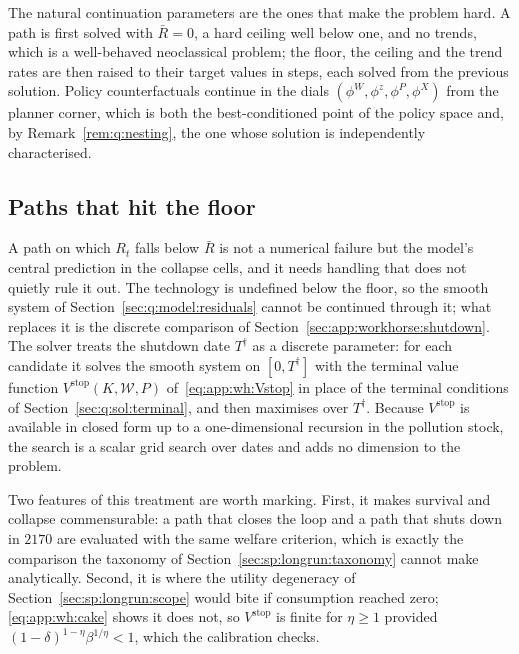  The natural continuation parameters are the ones that make the problem hard. A path is first solved with $\bar R=0$, a hard ceiling well below one, and no trends, which is a well-behaved neoclassical problem; the floor, the ceiling and the trend rates are then raised to their target values in steps, each solved from the previous solution. Policy counterfactuals continue in the dials $\left(\phi^W,\phi^z,\phi^P,\phi^X\right)$ from the planner corner, which is both the best-conditioned point of the policy space and, by Remark~\ref{rem:q:nesting}, the one whose solution is independently characterised.

\subsection{Paths that hit the floor}\label{sec:q:sol:collapse}

A path on which $R_t$ falls below $\bar R$ is not a numerical failure but the model's central prediction in the collapse cells, and it needs handling that does not quietly rule it out. The technology is undefined below the floor, so the smooth system of Section~\ref{sec:q:model:residuals} cannot be continued through it; what replaces it is the discrete comparison of Section~\ref{sec:app:workhorse:shutdown}. The solver treats the shutdown date $T^{\dagger}$ as a discrete parameter: for each candidate it solves the smooth system on $\left[0,T^{\dagger}\right]$ with the terminal value function $V^{\mathrm{stop}}\left(K,\mathcal W,P\right)$ of~\eqref{eq:app:wh:Vstop} in place of the terminal conditions of Section~\ref{sec:q:sol:terminal}, and then maximises over $T^{\dagger}$. Because $V^{\mathrm{stop}}$ is available in closed form up to a one-dimensional recursion in the pollution stock, the search is a scalar grid search over dates and adds no dimension to the problem.

Two features of this treatment are worth marking. First, it makes survival and collapse commensurable: a path that closes the loop and a path that shuts down in $2170$ are evaluated with the same welfare criterion, which is exactly the comparison the taxonomy of Section~\ref{sec:sp:longrun:taxonomy} cannot make analytically. Second, it is where the utility degeneracy of Section~\ref{sec:sp:longrun:scope} would bite if consumption reached zero; \eqref{eq:app:wh:cake} shows it does not, so $V^{\mathrm{stop}}$ is finite for $\eta\ge1$ provided $\left(1-\delta\right)^{1-\eta}\beta^{1/\eta}<1$, which the calibration checks.

